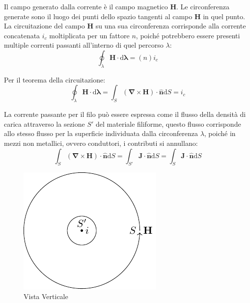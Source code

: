 \documentclass{article}
\newcommand{\vect}[1]{\boldsymbol{\mathbf{#1}}}
\newcommand{\df}{\mathrm{d}}
\numberwithin{equation}{subsection}
\begin{document}
Il campo generato dalla corrente è il campo magnetico $\vect{H}$. Le circonferenza generate sono il luogo dei punti dello spazio tangenti al campo $\vect{H}$ 
in quel punto. La circuitazione del campo $\vect{H}$ su una sua circonferenza corrisponde alla corrente concatenata $i_c$ moltiplicata per un fattore $n$, poiché potrebbero essere presenti multiple 
correnti passanti all'interno di quel percorso $\lambda$: 
\begin{equation*}
    \displaystyle\oint_{\lambda}\vect{H}\cdot \df\vect{\lambda}=(n)i_c
\end{equation*}

Per il teorema della circuitazione:
\begin{equation*}
    \displaystyle\oint_{\lambda}\vect{H}\cdot \df\vect{\lambda}=\int_S(\vect\nabla\times\vect{H})\cdot\hat{\vect{n}}\df S=i_c
\end{equation*}

La corrente passante per il filo può essere espressa come il flusso della densità di carica attraverso la sezione $S'$ del materiale filiforme, questo flusso corrisponde allo 
stesso flusso per la superficie individuata dalla circonferenza $\lambda$, poiché in mezzi non metallici, ovvero conduttori, i contributi si annullano:
\begin{equation}
    \displaystyle\int_S(\vect\nabla\times\vect{H})\cdot\hat{\vect{n}}\df S=\int_{S'}\vect{J}\cdot\hat{\vect{n}}\df S=\int_S\vect{J}\cdot\hat{\vect{n}}\df S
\end{equation}

\begin{figure}[H]%
    \centering
    \includegraphics{corrente-campo-magnetico.pdf}%
    \caption{Vista Verticale}
    \label{fig:corrente-campo-magnetico}
\end{figure}
\end{document}
